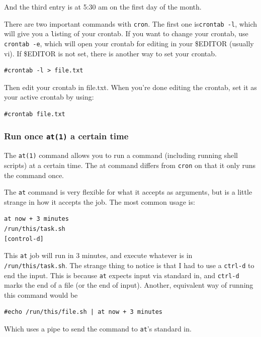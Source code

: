 And the third entry is at 5:30 am on the first day of the month. 

There are two important commands with {\tt cron}. The first one is{\tt crontab -l},
which will give you a {\tt l}isting of your crontab.  If you want to change your 
crontab, use {\tt crontab -e}, which will open your crontab for editing in your 
\$EDITOR (usually vi). If \$EDITOR is not set, there is another way to set your crontab.

\begin{verbatim}
#crontab -l > file.txt
\end{verbatim}

Then edit your crontab in file.txt. When you're done editing the crontab, set it as
your active crontab by using:

\begin{verbatim}
#crontab file.txt
\end{verbatim}


\subsubsection{Run once {\tt at(1)} a certain time}

The {\tt at(1)} command allows you to run a command (including running shell scripts) 
at a certain time. The at command differs from {\tt cron} on that it only 
runs the command once.

The {\tt at} command is very flexible for what it accepts as arguments,
but is a little strange in how it accepts the job. The most
common usage is:

\begin{verbatim}
at now + 3 minutes 
/run/this/task.sh    
[control-d]
\end{verbatim}

This  {\tt at} job will run in 3 minutes, and execute whatever is
in {\tt /run/this/task.sh}. The strange thing to notice is that I 
had to use a {\tt ctrl-d} to end the input. This is because 
{\tt at} expects input via standard in, and {\tt ctrl-d} marks the 
end of a file (or the end of input). Another, equivalent way of running this command would be

\begin{verbatim}
#echo /run/this/file.sh | at now + 3 minutes
\end{verbatim}

Which uses a pipe to send the command to {\tt at}'s standard in.

